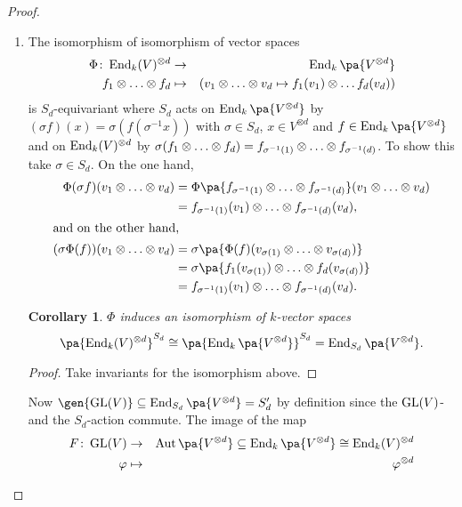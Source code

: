 \documentclass[12pt,a4paper]{scrartcl}
\theoremstyle{cplain}
\newtheorem{cor}[thmcounter]{Corollary}
\theoremstyle{cplain}
\theoremstyle{cplain}
\theoremstyle{definition}
\begin{document}
\begin{otherlanguage}{english}
\begin{proof}
  \leavevmode
  \begin{enumerate}[label=\ref{thm:schur weyl:\arabic*}]
    \item The isomorphism of isomorphism of vector spaces
    \begin{eqnarray*}
      \Phi\colon \End_k(V)^{\otimes d} &\to& \End_k\pa{V^{\otimes d}} \\
      f_1 \tp \ldots \tp f_d &\mapsto& (v_1 \tp \ldots\tp v_d \mapsto f_1(v_1) \tp \ldots f_d(v_d))
    \end{eqnarray*}
    is $S_d$-equivariant where $S_d$ acts on $\End_k\pa{V^{\otimes d}}$ by $(\sigma f)(x) = \sigma(f(\sigma^{-1}x))$ with $\sigma \in S_d$, $x \in V^{\otimes d}$ and $f\in \End_k\pa{V^{\otimes d}}$ and on $\operatorname{End}_k(V)^{\otimes d}$ by $\sigma (f_1 \otimes \ldots \otimes f_d) = f_{\sigma^{-1}(1)} \otimes \ldots \otimes f_{\sigma^{-1}(d)}$. To show this take $\sigma \in S_d$. On the one hand,
    \begin{align*}
      \Phi(\sigma f)(v_1 \tp \ldots \tp v_d) &= \Phi\pa{f_{\sigma^{-1}(1)} \tp \ldots \tp f_{\sigma^{-1}(d)}}(v_1 \tp \ldots \tp v_d) \\ &= f_{\sigma^{-1}(1)}(v_1) \tp \ldots \tp f_{\sigma^{-1}(d)}(v_d), \\\intertext{and on the other hand,}
    (\sigma\Phi(f))(v_1 \tp \ldots \tp v_d) &= \sigma\pa{\Phi(f)(v_{\sigma(1)} \tp \ldots \tp v_{\sigma(d)})} \\ &= \sigma\pa{f_1(v_{\sigma(1)}) \tp \ldots \tp f_d(v_{\sigma(d)})} \\ &= f_{\sigma^{-1}(1)}(v_1) \tp \ldots \tp f_{\sigma^{-1}(d)}(v_d).
    \end{align*}
    \begin{cor}
      $\Phi$ induces an isomorphism of $k$-vector spaces \[\pa{\End_k(V)^{\tp d}}^{S_d} \cong \pa{\End_k\pa{V^{\tp d}}}^{S_d} = \End_{S_d}\pa{V^{\tp d}}.\]
    \end{cor}
    \begin{proof}
      Take invariants for the isomorphism above.
    \end{proof}
    Now $\gen{\GL(V)} \subseteq \End_{S_d}\pa{V^{\tp d}} = S_d'$ by definition since the $\operatorname{GL}(V)$- and the $S_d$-action commute. The image of the map
    \begin{eqnarray*}
      F\colon \GL(V) &\to& \Aut\pa{V^{\tp d}} \subseteq \End_k\pa{V^{\tp d}} \cong \End_k(V)^{\tp d} \\
      \phi &\mapsto& \phi^{\tp d}
    \end{eqnarray*}

\end{enumerate}
\end{proof}
\end{otherlanguage}
\end{document}
